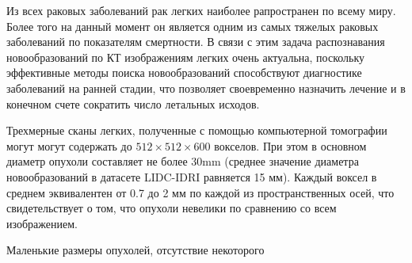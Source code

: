 
Из всех раковых заболеваний рак легких наиболее рапространен по всему миру. Более того на данный момент он является одним из самых тяжелых раковых заболеваний по показателям смертности. В связи с этим задача распознавания новообразований по КТ изображениям легких очень актуальна, поскольку эффективные методы поиска новообразований способствуют диагностике заболеваний на ранней стадии, что позволяет своевременно назначить лечение и в конечном счете сократить число летальных исходов.

Трехмерные сканы легких, полученные с помощью компьютерной томографии могут могут содержать до $512 \times 512 \times 600$ вокселов. При этом в основном диаметр опухоли составляет не более 30mm (среднее значение диаметра новообразований в датасете LIDC-IDRI \cite{lidc} равняется 15 мм). Каждый воксел в среднем эквивалентен от 0.7 до 2 мм по каждой из пространственных осей, что свидетельствует о том, что опухоли невелики по сравнению со всем изображением. 

Маленькие размеры опухолей, отсутствие некоторого 

